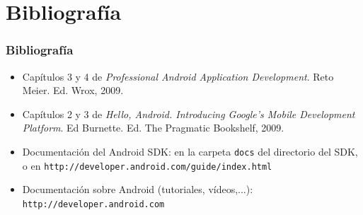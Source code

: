 \documentclass[hyperref={pdfpagelabels=true},ucs]{beamer}
\newcommand{\dif}{\textsl}
\begin{document}
\section{Bibliografía}

\begin{frame}[fragile]
\frametitle{Bibliografía}

\begin{itemize}
\item Capítulos 3 y 4 de \dif{Professional Android Application
  Development}. Reto Meier. Ed. Wrox, 2009.
\item Capítulos 2 y 3 de \dif{Hello, Android. Introducing Google's
    Mobile Development Platform}. Ed Burnette. Ed. The Pragmatic
  Bookshelf, 2009.
\item Documentación del Android SDK: en la carpeta \verb|docs| del
  directorio del SDK, o en
  \verb|http://developer.android.com/guide/index.html|
\item Documentación sobre Android (tutoriales, vídeos,...): 
  \verb|http://developer.android.com|
\end{itemize}
\end{frame}
\end{document}

